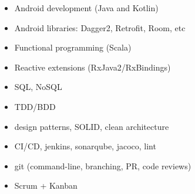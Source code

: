 \begin{multicols}{2}
    \begin{itemize}
	    \item Android development (Java and Kotlin)
	    \item Android libraries: Dagger2, Retrofit, Room, etc
	    \item Functional programming (Scala)
	    \item Reactive extensions (RxJava2/RxBindings) 
	    \item SQL, NoSQL
	    \item TDD/BDD
	    \item design patterns, SOLID, clean architecture
	    \item CI/CD, jenkins, sonarqube, jacoco, lint
	    \item git (command-line, branching, PR, code reviews)
	    \item Scrum + Kanban
    \end{itemize}
 \end{multicols}
